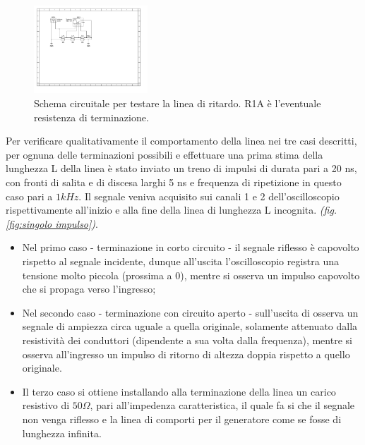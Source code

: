 \documentclass[journal]{IEEEtran}
\begin{document}
\begin{figure}[H]%
\begin {center}
\includegraphics[width=0.38\textwidth]{sch-simulations/output/Transmission line.pdf}
\caption{Schema circuitale per testare la linea di ritardo. R1A è l'eventuale resistenza di terminazione.}
\label{fig:linea di ritardo}
\end {center}
\end{figure}

Per verificare qualitativamente il comportamento della linea nei tre casi descritti, per ognuna delle terminazioni possibili e effettuare una prima stima della lunghezza L della linea è stato inviato un treno di impulsi di durata pari a 20 ns, con fronti di salita e di discesa larghi 5 ns e frequenza di ripetizione in questo caso pari a $1 kHz$. Il segnale veniva acquisito sui canali 1 e 2 dell'oscilloscopio rispettivamente all'inizio e alla fine della linea di lunghezza L incognita. \textit{(fig. \ref{fig:singolo impulso})}.


\begin{itemize}
    \item Nel primo caso - terminazione in corto circuito - il segnale riflesso è capovolto rispetto al segnale incidente, dunque all'uscita l'oscilloscopio registra una tensione molto piccola (prossima a 0), mentre si osserva un impulso capovolto che si propaga verso l'ingresso;
    \item Nel secondo caso - terminazione con circuito aperto - sull'uscita di osserva un segnale di ampiezza circa uguale a quella originale, solamente attenuato dalla resistività dei conduttori (dipendente a sua volta dalla frequenza), mentre si osserva all'ingresso un impulso di ritorno di altezza doppia rispetto a quello originale.
    \item Il terzo caso si ottiene installando alla terminazione della linea un carico resistivo di $50 \Omega$, pari all'impedenza caratteristica, il quale fa si che il segnale non venga riflesso e la linea di comporti per il generatore come se fosse di lunghezza infinita.
\end{itemize}
 
\end{document}
